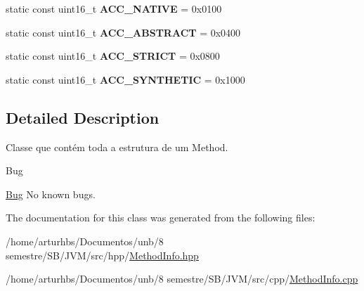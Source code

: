 \begin{DoxyCompactItemize}
\item 
static const uint16\+\_\+t {\bfseries A\+C\+C\+\_\+\+N\+A\+T\+I\+VE} = 0x0100\hypertarget{classMethodInfo_a5be7aad6dd747cb60a059aff7f6bf14c}{}\label{classMethodInfo_a5be7aad6dd747cb60a059aff7f6bf14c}

\item 
static const uint16\+\_\+t {\bfseries A\+C\+C\+\_\+\+A\+B\+S\+T\+R\+A\+CT} = 0x0400\hypertarget{classMethodInfo_a220d90f2bc05772aed488b598ec54d94}{}\label{classMethodInfo_a220d90f2bc05772aed488b598ec54d94}

\item 
static const uint16\+\_\+t {\bfseries A\+C\+C\+\_\+\+S\+T\+R\+I\+CT} = 0x0800\hypertarget{classMethodInfo_a83b3d5b0225d1a35d90f5fe3571e7a59}{}\label{classMethodInfo_a83b3d5b0225d1a35d90f5fe3571e7a59}

\item 
static const uint16\+\_\+t {\bfseries A\+C\+C\+\_\+\+S\+Y\+N\+T\+H\+E\+T\+IC} = 0x1000\hypertarget{classMethodInfo_adbdfc13db237a1860763d0f795bdf2d0}{}\label{classMethodInfo_adbdfc13db237a1860763d0f795bdf2d0}

\end{DoxyCompactItemize}


\subsection{Detailed Description}
Classe que contém toda a estrutura de um Method. 

\begin{DoxyRefDesc}{Bug}
\item[\hyperlink{bug__bug000033}{Bug}]No known bugs. \end{DoxyRefDesc}


The documentation for this class was generated from the following files\+:\begin{DoxyCompactItemize}
\item 
/home/arturhbs/\+Documentos/unb/8 semestre/\+S\+B/\+J\+V\+M/src/hpp/\hyperlink{MethodInfo_8hpp}{Method\+Info.\+hpp}\item 
/home/arturhbs/\+Documentos/unb/8 semestre/\+S\+B/\+J\+V\+M/src/cpp/\hyperlink{MethodInfo_8cpp}{Method\+Info.\+cpp}\end{DoxyCompactItemize}
